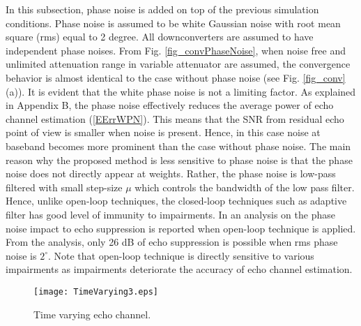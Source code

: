 \documentclass[twocolumn]{IEEEtran}
\begin{document}
In this subsection, phase noise is added on top of the previous
simulation conditions. Phase noise is assumed to be white Gaussian
noise with root mean square (rms) equal to 2 degree. All
downconverters are assumed to have independent phase noises. From
Fig. \ref{fig_convPhaseNoise}, when noise free and unlimited
attenuation range in variable attenuator are assumed, the
convergence behavior is almost identical to the case without phase
noise (see Fig. \ref{fig_conv} (a)). It is evident that the white
phase noise is not a limiting factor. As explained in Appendix B,
the phase noise effectively reduces the average power of echo
channel estimation (\ref{EErrWPN}). This means that the SNR from
residual echo point of view is smaller when noise is present. Hence,
in this case noise at baseband becomes more prominent than the case
without phase noise. The main reason why the proposed method is less
sensitive to phase noise is that the phase noise does not directly
appear at weights. Rather, the phase noise is low-pass filtered with
small step-size $\mu$ which controls the bandwidth of the low pass
filter. Hence, unlike open-loop techniques, the closed-loop
techniques such as adaptive filter has good level of immunity to
impairments. In \cite{phasenoise} an analysis on the phase noise
impact to echo suppression is reported when open-loop technique is
applied. From the analysis, only 26 dB of echo suppression is
possible when rms phase noise is $2^\circ$. Note that open-loop
technique is directly sensitive to various impairments as
impairments deteriorate the accuracy of echo channel estimation.

\begin{figure}[!t]

\centering
    {\texttt{[image: TimeVarying3.eps]}}


\caption{Time varying echo channel. \label{fig_tvh} }

\end{figure}
\end{document}

